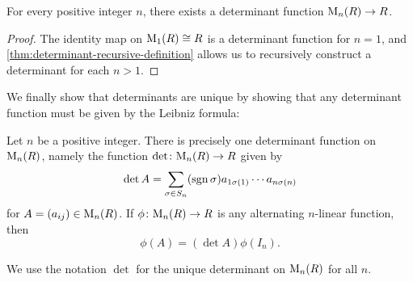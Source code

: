 \begin{corollary}
    For every positive integer $n$, there exists a determinant function $\mathrm{M}_{n}(R) \to R$.
\end{corollary}

\begin{proof}
    The identity map on $\mathrm{M}_{1}(R) \cong R$ is a determinant function for $n = 1$, and \cref{thm:determinant-recursive-definition} allows us to recursively construct a determinant for each $n > 1$.
\end{proof}

We finally show that determinants are unique by showing that any determinant function must be given by the Leibniz formula:

\begin{theorem}
    \label{thm:determinant-uniqueness}
    Let $n$ be a positive integer. There is precisely one determinant function on $\mathrm{M}_{n}(R)$, namely the function $\det \colon \mathrm{M}_{n}(R) \to R$ given by
    \begin{equation*}
        \det A
            = \sum_{\sigma \in S_n} (\operatorname{sgn}\sigma) a_{1 \sigma(1)} \cdots a_{n \sigma(n)}
    \end{equation*}
    for $A = (a_{ij}) \in \mathrm{M}_{n}(R)$. If $\phi \colon \mat{n}{R} \to R$ is any alternating $n$-linear function, then
    \begin{equation*}
        \phi(A)
            = (\det A) \phi(I_n).
    \end{equation*}
\end{theorem}
%
We use the notation $\det$ for the unique determinant on $\mathrm{M}_{n}(R)$ for all $n$.

